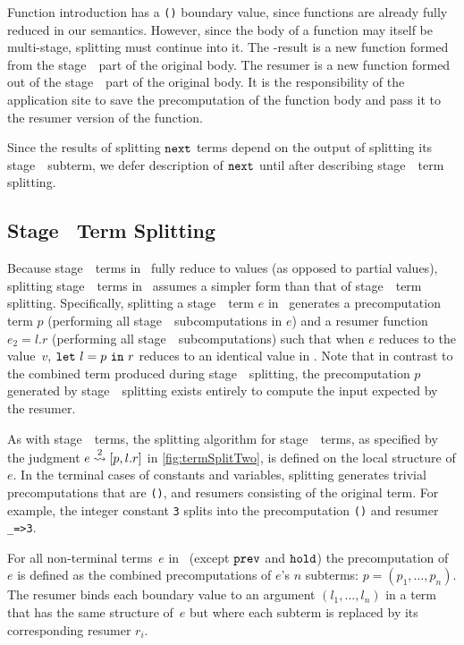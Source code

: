 Function introduction has a \texttt{()} boundary value,
since functions are already fully reduced in our semantics.
However, since the body of a function may itself be multi-stage, splitting must continue into it.
The \bbone-result is a new function formed from the stage~\bbone\ part of the original body.
The resumer is a new function formed out of the stage~\bbtwo\ part of the original body.
It is the responsibility of the application site to save the precomputation of the function body
and pass it to the resumer version of the function.

Since the results of splitting ${\tt next}$ terms depend on the output of splitting its stage~\bbtwo\ subterm,
we defer description of ${\tt next}$ until after describing stage~\bbtwo\ term splitting.

\subsection{Stage \bbtwo\ Term Splitting}

Because stage~\bbtwo\ terms in \lang\ fully reduce to values (as opposed to partial values),
splitting stage~\bbtwo\ terms in \lang\ assumes a simpler form than that of stage~\bbone\ term splitting. 
Specifically, splitting a stage~\bbtwo\ term $e$ in \lang\ generates a precomputation term $p$
(performing all stage~\bbone\ subcomputations in $e$) and a
resumer function $e_2=l.r$ (performing all stage~\bbtwo\ subcomputations) such that when 
$e$ reduces to the value~$v$, ${\tt let}~{l} = {p}~{\tt in}~{r}$ reduces to an identical value in \langmono.
Note that in contrast to the combined term produced during stage~\bbone\ splitting,
the precomputation $p$ generated by stage~\bbtwo\ splitting exists entirely
to compute the input expected by the resumer.


As with stage~\bbone\ terms, the splitting algorithm for stage~\bbtwo\ terms,
as specified by the judgment $e \overset{ 2}\rightsquigarrow [p,l.r]$ in \cref{fig:termSplitTwo}, is defined on the local structure of $e$.
In the terminal cases of
constants and variables, splitting generates trivial precomputations that are \texttt{()}, and resumers consisting of the original term.
For example, the integer constant \texttt{3} splits into the
precomputation \texttt{()} and resumer \texttt{\_=>3}.

For all non-terminal terms~$e$ in \lang\ (except ${\tt prev}$
and ${\tt hold}$)
the precomputation of~$e$ is defined as the combined precomputations of $e$'s $n$ subterms:
$p=(p_1,\ldots,p_n)$.  The resumer binds each boundary value to an
argument $(l_1,\ldots,l_n)$ in a term that has the same structure
of~$e$ but where each subterm is replaced by its corresponding resumer $r_i$.

